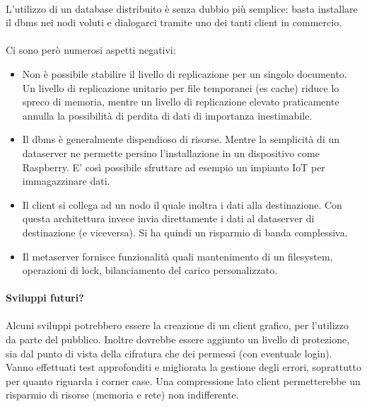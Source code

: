 \documentclass{article}
\begin{document}
\paragraph{} L'utilizzo di un database distribuito è senza dubbio più semplice: basta installare il dbms nei nodi voluti e dialogarci tramite uno dei tanti client in commercio. 

\paragraph{} Ci sono però numerosi aspetti negativi: \begin{itemize}
	\item Non è possibile stabilire il livello di replicazione per un singolo documento. Un livello di replicazione unitario per file temporanei (es cache) riduce lo spreco di memoria, mentre un livello di replicazione elevato praticamente annulla la possibilità di perdita di dati di importanza inestimabile.
	\item Il dbms è generalmente dispendioso di risorse. Mentre la semplicità di un dataserver ne permette persino l'installazione in un dispositivo come Raspberry. E' così possibile sfruttare ad esempio un impianto IoT per immagazzinare dati. 
	\item Il client si collega ad un nodo il quale inoltra i dati alla destinazione. Con questa architettura invece invia direttamente i dati al dataserver di destinazione (e viceversa). Si ha quindi un risparmio di banda complessiva.  
	\item Il metaserver fornisce funzionalità quali mantenimento di un filesystem, operazioni di lock, bilanciamento del carico personalizzato. 
\end{itemize}

\paragraph{Sviluppi futuri?}

\paragraph{} Alcuni sviluppi potrebbero essere la creazione di un client grafico, per l'utilizzo da parte del pubblico. Inoltre dovrebbe essere aggiunto un livello di protezione, sia dal punto di vista della cifratura che dei permessi (con eventuale login). Vanno effettuati test approfonditi e migliorata la gestione degli errori, soprattutto per quanto riguarda i corner case. Una compressione lato client permetterebbe un risparmio di risorse (memoria e rete) non indifferente. 
\end{document}

